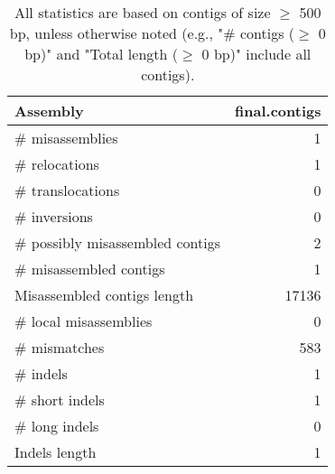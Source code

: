 \documentclass[12pt,a4paper]{article}
\begin{document}
\begin{table}[ht]
\begin{center}
\caption{All statistics are based on contigs of size $\geq$ 500 bp, unless otherwise noted (e.g., "\# contigs ($\geq$ 0 bp)" and "Total length ($\geq$ 0 bp)" include all contigs).}
\begin{tabular}{|l*{1}{|r}|}
\hline
Assembly & final.contigs \\ \hline
\# misassemblies & 1 \\ \hline
\hspace{5mm}\# relocations & 1 \\ \hline
\hspace{5mm}\# translocations & 0 \\ \hline
\hspace{5mm}\# inversions & 0 \\ \hline
\# possibly misassembled contigs & 2 \\ \hline
\# misassembled contigs & 1 \\ \hline
Misassembled contigs length & 17136 \\ \hline
\# local misassemblies & 0 \\ \hline
\# mismatches & 583 \\ \hline
\# indels & 1 \\ \hline
\hspace{5mm}\# short indels & 1 \\ \hline
\hspace{5mm}\# long indels & 0 \\ \hline
Indels length & 1 \\ \hline
\end{tabular}
\end{center}
\end{table}
\end{document}
